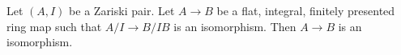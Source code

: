 \begin{lemma}
\label{lemma-check-isomorphism-zariski}
Let $(A, I)$ be a Zariski pair. Let $A \to B$ be a flat,
integral, finitely presented ring map such that $A/I \to B/IB$
is an isomorphism. Then $A \to B$ is an isomorphism.
\end{lemma}